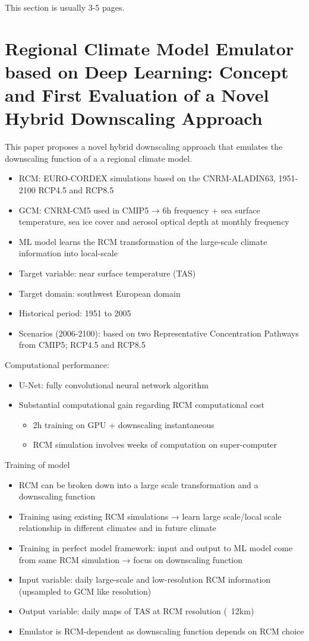 \documentclass[a4paper,11pt,oneside]{report}
\begin{document}
This section is usually 3-5 pages.

\section{Regional Climate Model Emulator based on Deep Learning: Concept and First Evaluation of a Novel Hybrid Downscaling Approach \cite{Doury}}
This paper proposes a novel hybrid downscaling approach that emulates the downscaling function of a a regional climate model.

\begin{itemize}
\item RCM: EURO-CORDEX simulations based on the CNRM-ALADIN63, 1951-2100 RCP4.5 and RCP8.5
\item GCM: CNRM-CM5 used in CMIP5 → 6h frequency + sea surface temperature, sea ice cover and aerosol optical depth at monthly frequency
\item ML model learns the RCM transformation of the large-scale climate information into local-scale
\item Target variable: near surface temperature (TAS)
\item Target domain: southwest European domain
\item Historical period: 1951 to 2005
\item Scenarios (2006-2100): based on two Representative Concentration Pathways from CMIP5; RCP4.5 and RCP8.5
\end{itemize}
Computational performance:
\begin{itemize}
    \item U-Net: fully convolutional neural network algorithm
    \item Substantial computational gain regarding RCM computational cost
    \begin{itemize}
        \item 2h training on GPU + downscaling instantaneous
        \item RCM simulation involves weeks of computation on super-computer
    \end{itemize}
\end{itemize}
Training of model 
\begin{itemize}
    \item RCM can be broken down into a large scale transformation and a downscaling function
    \item Training using existing RCM simulations → learn large scale/local scale relationship in different climates and in future climate
    \item Training in perfect model framework: input and output to ML model come from same RCM simulation → focus on downscaling function
    \item Input variable: daily large-scale and low-resolution RCM information (upsampled to GCM like resolution)
    \item Output variable: daily maps of TAS at RCM resolution (~12km)
    \item Emulator is RCM-dependent as downscaling function depends on RCM choice
\end{itemize}
\end{document}
